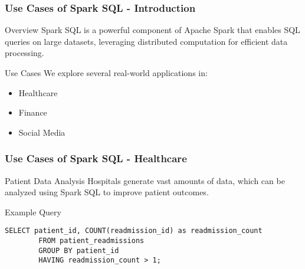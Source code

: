 \documentclass[aspectratio=169]{beamer}
\begin{document}
\begin{frame}[fragile]
    \frametitle{Use Cases of Spark SQL - Introduction}
    \begin{block}{Overview}
        Spark SQL is a powerful component of Apache Spark that enables SQL queries on large datasets, leveraging distributed computation for efficient data processing.
    \end{block}
    \begin{block}{Use Cases}
        We explore several real-world applications in:
        \begin{itemize}
            \item Healthcare
            \item Finance
            \item Social Media
        \end{itemize}
    \end{block}
\end{frame}

\begin{frame}[fragile]
    \frametitle{Use Cases of Spark SQL - Healthcare}
    \begin{block}{Patient Data Analysis}
        Hospitals generate vast amounts of data, which can be analyzed using Spark SQL to improve patient outcomes.
    \end{block}
    \begin{exampleblock}{Example Query}
        \begin{lstlisting}[style=mystyle]
        SELECT patient_id, COUNT(readmission_id) as readmission_count 
        FROM patient_readmissions 
        GROUP BY patient_id 
        HAVING readmission_count > 1;
        \end{lstlisting}
    \end{exampleblock}
\end{frame}
\end{document}
